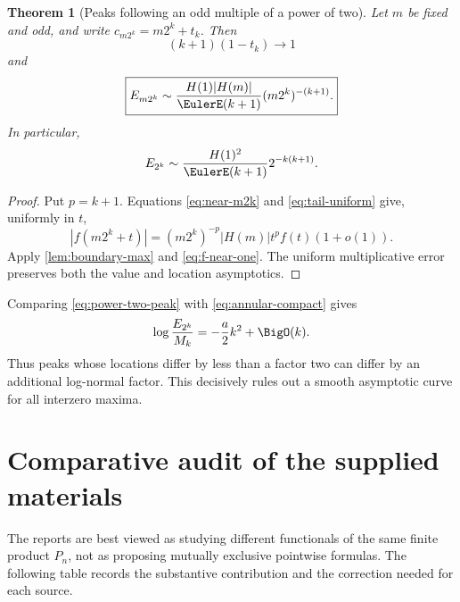 \documentclass[11pt,oneside]{article}
\newtheorem{theorem}{Theorem}[section]
\theoremstyle{definition}
\theoremstyle{remark}
\begin{document}
\begin{theorem}[Peaks following an odd multiple of a power of two]
\label{thm:two-adic-peaks}
Let $m$ be fixed and odd, and write $c_{m2^k}=m2^k+t_k$.  Then
\begin{equation}
 (k+1)(1-t_k)\longrightarrow1
 \label{eq:peak-location-two-adic}
\end{equation}
and
\begin{equation}
 \boxed{
 E_{m2^k}\sim
 \frac{H(1)|H(m)|}{\EulerE(k+1)}(m2^k)^{-(k+1)}.}
 \label{eq:two-adic-peak}
\end{equation}
In particular,
\begin{equation}
 E_{2^k}\sim
 \frac{H(1)^2}{\EulerE(k+1)}2^{-k(k+1)}.
 \label{eq:power-two-peak}
\end{equation}
\end{theorem}

\begin{proof}
Put $p=k+1$.  Equations \eqref{eq:near-m2k} and \eqref{eq:tail-uniform} give,
uniformly in $t$,
\[
 |f(m2^k+t)|
 =(m2^k)^{-p}|H(m)|t^pf(t)(1+o(1)).
\]
Apply \cref{lem:boundary-max} and \eqref{eq:f-near-one}.  The uniform
multiplicative error preserves both the value and location asymptotics.
\end{proof}

Comparing \eqref{eq:power-two-peak} with \eqref{eq:annular-compact} gives
\begin{equation}
 \log\frac{E_{2^k}}{M_k}=-\frac a2k^2+\BigO(k).
 \label{eq:peak-spread}
\end{equation}
Thus peaks whose locations differ by less than a factor two can differ by an
additional log-normal factor.  This decisively rules out a smooth asymptotic
curve for all interzero maxima.

\section{Comparative audit of the supplied materials}
\label{sec:audit}

The reports are best viewed as studying different functionals of the same
finite product $P_n$, not as proposing mutually exclusive pointwise formulas.
The following table records the substantive contribution and the correction
needed for each source.
\end{document}
